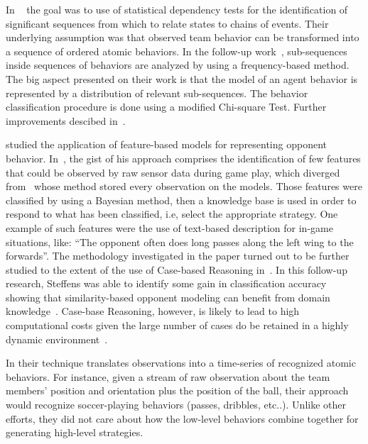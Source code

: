 In ~\cite{Igresias2006} the goal was to use of statistical dependency tests for the identification of significant sequences from which to relate states to chains of events. Their underlying assumption was that observed team behavior can be transformed into a sequence of ordered atomic behaviors. In the follow-up work~\cite{burgard2008classifying}, sub-sequences inside sequences of behaviors are analyzed by using a frequency-based method. The big aspect presented on their work is that the model of an agent behavior is represented by a distribution of relevant sub-sequences. The behavior classification procedure is done using a modified Chi-square Test. Further improvements descibed in~\cite{iglesias2009winning}.

\cite{steffens2003feature, steffens2005similarity} studied the application of feature-based models for representing opponent behavior. In~\cite{steffens2003feature}, the gist of his approach comprises the identification of few features that could be observed by raw sensor data during game play, which diverged from~\cite{Riley&Veloso2000} whose method stored every observation on the models. Those features were classified by using a Bayesian method, then a knowledge base is used in order to respond to what has been classified, i.e, select the appropriate strategy. One example of such features were the use of text-based description for in-game situations, like: ``The opponent often does long passes along the left wing to the forwards''. The methodology investigated in the paper turned out to be further studied to the extent of the use of Case-based Reasoning in~\cite{steffens2005similarity}. In this follow-up research, Steffens was able to identify some gain in classification accuracy showing that similarity-based opponent modeling can benefit from domain knowledge~\cite{OppRobocup}. Case-base Reasoning, however, is likely to lead to high computational costs given the large number of cases do be retained in a highly dynamic environment~\cite{Ahmadi2004,OppRobocup}.

In \cite{kaminka2003learning} their technique translates observations into a time-series of recognized atomic behaviors. For instance, given a stream of raw observation about the team members' position and orientation plus the position of the ball, their approach would recognize soccer-playing behaviors (passes, dribbles, etc..). Unlike other efforts, they did not care about how the low-level behaviors combine together for generating high-level strategies.  


